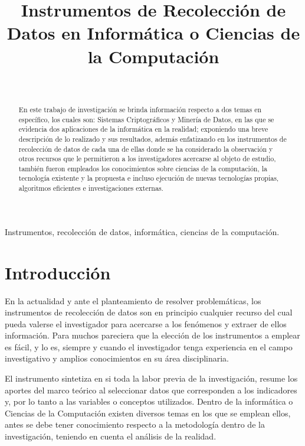 \documentclass[10pt,journal]{IEEEtran}
\title{Instrumentos de Recolección de Datos en Informática o Ciencias de la Computación}
\author{
\IEEEauthorblockN{{\Large Angely Mendez Cruz}} \\
\vspace{2mm}
\IEEEauthorblockA{\textit{Metodología de la Investigación Científica} \\
\textit{Escuela de Informática} \\
\textit{Facultad de Ciencias Físicas y Matemáticas} \\
\textit{Universidad Nacional de Trujillo, \\ Perú }
\\ \vspace{1mm}
t052701020@unitru.edu.pe}}
\begin{document}
\renewcommand{\IEEEkeywordsname}{{\bfseries Palabras claves:}} %

\maketitle

    \begin{abstract}
    En este trabajo de investigación se brinda información respecto a dos temas en específico, los cuales son: Sistemas Criptográficos y Minería de Datos, en las que se evidencia dos aplicaciones de la informática en la realidad; exponiendo una breve descripción de lo realizado y sus resultados, además enfatizando en los instrumentos de recolección de datos de cada una de ellas donde se ha considerado la observación y otros recursos que le permitieron a los investigadores acercarse al objeto de estudio, también fueron empleados los conocimientos sobre ciencias de la computación, la tecnología existente y la propuesta e incluso ejecución de nuevas tecnologías propias, algoritmos eficientes e investigaciones externas.
    \end{abstract}
    
    \begin{IEEEkeywords}
    Instrumentos, recolección de datos, informática, ciencias de la computación.
    \end{IEEEkeywords}
    
    \section{\textbf{Introducción}}
    
    En la actualidad y ante el planteamiento de resolver problemáticas, los instrumentos de recolección de datos son en principio cualquier recurso del cual pueda valerse el investigador para acercarse a los fenómenos y extraer de ellos información. Para muchos pareciera que la elección de los instrumentos a emplear es fácil, y lo es, siempre y cuando el investigador tenga experiencia en el campo investigativo y amplios conocimientos en su área disciplinaria.
    
    El instrumento sintetiza en si toda la labor previa de la investigación, resume los aportes del marco teórico al seleccionar datos que corresponden a los indicadores y, por lo tanto a las variables o conceptos utilizados. Dentro de la informática o Ciencias de la Computación existen diversos temas en los que se emplean ellos, antes se debe tener conocimiento respecto a la metodología dentro de la investigación, teniendo en cuenta el análisis de la realidad.
\end{document}
